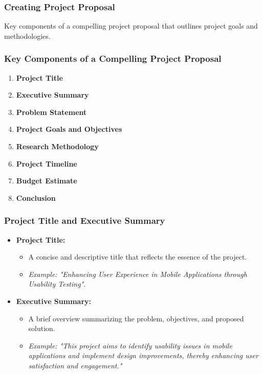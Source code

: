 \documentclass{beamer}
\begin{document}
\begin{frame}[fragile]
    \frametitle{Creating Project Proposal}
    Key components of a compelling project proposal that outlines project goals and methodologies.
\end{frame}

\begin{frame}[fragile]
    \frametitle{Key Components of a Compelling Project Proposal}
    \begin{enumerate}
        \item \textbf{Project Title}
        \item \textbf{Executive Summary}
        \item \textbf{Problem Statement}
        \item \textbf{Project Goals and Objectives}
        \item \textbf{Research Methodology}
        \item \textbf{Project Timeline}
        \item \textbf{Budget Estimate}
        \item \textbf{Conclusion}
    \end{enumerate}
\end{frame}

\begin{frame}[fragile]
    \frametitle{Project Title and Executive Summary}
    \begin{itemize}
        \item \textbf{Project Title:}
        \begin{itemize}
            \item A concise and descriptive title that reflects the essence of the project.
            \item \textit{Example: "Enhancing User Experience in Mobile Applications through Usability Testing".}
        \end{itemize}

        \item \textbf{Executive Summary:}
        \begin{itemize}
            \item A brief overview summarizing the problem, objectives, and proposed solution.
            \item \textit{Example: "This project aims to identify usability issues in mobile applications and implement design improvements, thereby enhancing user satisfaction and engagement."}
        \end{itemize}
    \end{itemize}
\end{frame}
\end{document}
